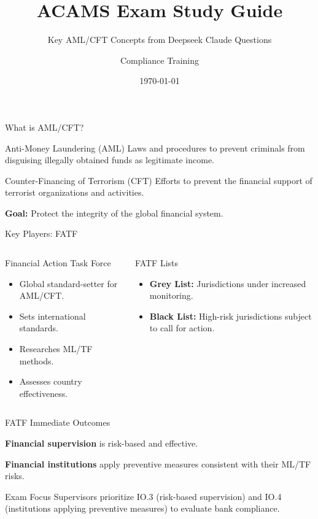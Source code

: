 \documentclass{beamer}
\title{ACAMS Exam Study Guide}
\subtitle{Key AML/CFT Concepts from Deepseek Claude Questions}
\author{Compliance Training}
\date{\today}
\begin{document}
	
	\begin{frame}
		\titlepage
	\end{frame}
	
	\begin{frame}{What is AML/CFT?}
		\begin{block}{Anti-Money Laundering (AML)}
			Laws and procedures to prevent criminals from disguising illegally obtained funds as legitimate income.
		\end{block}
		\begin{block}{Counter-Financing of Terrorism (CFT)}
			Efforts to prevent the financial support of terrorist organizations and activities.
		\end{block}
		\textbf{Goal:} Protect the integrity of the global financial system.
	\end{frame}
	
	\begin{frame}{Key Players: FATF}
		\begin{columns}[T]
			\column{0.5\textwidth}
			\begin{alertblock}{Financial Action Task Force}
				\begin{itemize}
					\item Global standard-setter for AML/CFT.
					\item Sets international standards.
					\item Researches ML/TF methods.
					\item Assesses country effectiveness.
				\end{itemize}
			\end{alertblock}
			\column{0.5\textwidth}
			\begin{exampleblock}{FATF Lists}
				\begin{itemize}
					\item \textbf{Grey List:} Jurisdictions under increased monitoring.
					\item \textbf{Black List:} High-risk jurisdictions subject to call for action.
				\end{itemize}
			\end{exampleblock}
		\end{columns}
	\end{frame}
	
	\begin{frame}{FATF Immediate Outcomes}
		\begin{definition}
			\textbf{Financial supervision} is risk-based and effective.
		\end{definition}
		\begin{definition}
			\textbf{Financial institutions} apply preventive measures consistent with their ML/TF risks.
		\end{definition}
		\begin{block}{Exam Focus}
			Supervisors prioritize IO.3 (risk-based supervision) and IO.4 (institutions applying preventive measures) to evaluate bank compliance.
		\end{block}
	\end{frame}
	
\end{document}

